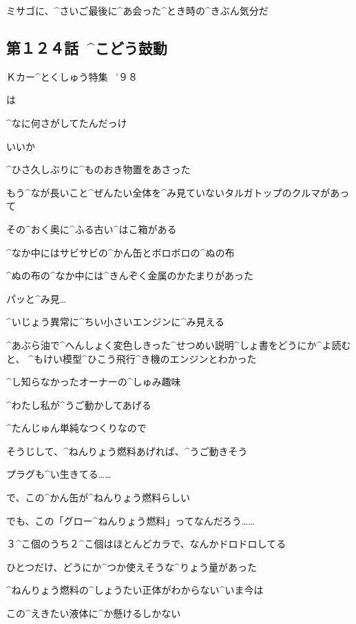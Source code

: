 \Ayase ミサゴに、^{さいご}{最後}に^{あ}{会}った^{とき}{時}の^{きぶん}{気分}だ


\subsection{第１２４話\ ^{こどう}{鼓動}}

\page[52]
\Sign Ｋカー^{とくしゅう}{特集}
\ ’９８

\Alpha は

\Alpha ^{なに}{何}さがしてたんだっけ

\page[53]
\Alpha いいか

\Alpha ^{ひさ}{久}しぶりに^{ものおき}{物置}をあさった

\Alpha もう^{なが}{長}いこと^{ぜんたい}{全体}を^{み}{見}ていないタルガトップのクルマがあって

\Alpha その^{おく}{奥}に^{ふる}{古}い^{はこ}{箱}がある

\page[54]
\Alpha ^{なか}{中}にはサビサビの^{かん}{缶}とボロボロの^{ぬの}{布}

\Alpha ^{ぬの}{布}の^{なか}{中}には^{きんぞく}{金属}のかたまりがあった

\Alpha パッと^{み}{見}…

\Alpha ^{いじょう}{異常}に^{ちい}{小}さいエンジンに^{み}{見}える

\page[55]
\Alpha ^{あぶら}{油}で^{へんしょく}{変色}しきった^{せつめい}{説明}^{しょ}{書}をどうにか^{よ}{読}むと、
^{もけい}{模型}^{ひこう}{飛行}^{き}{機}のエンジンとわかった

\Alpha ^{し}{知}らなかったオーナーの^{しゅみ}{趣味}

\Alpha ^{わたし}{私}が^{うご}{動}かしてあげる

\page[56]
\Alpha ^{たんじゅん}{単純}なつくりなので

\Alpha そうじして、^{ねんりょう}{燃料}あげれば、^{うご}{動}きそう

\Alpha プラグも^{い}{生}きてる……

\Alpha で、この^{かん}{缶}が^{ねんりょう}{燃料}らしい

\Alpha でも、この「グロー^{ねんりょう}{燃料}」ってなんだろう……

\Alpha ３^{こ}{個}のうち２^{こ}{個}はほとんどカラで、なんかドロドロしてる

\Alpha ひとつだけ、どうにか^{つか}{使}えそうな^{りょう}{量}があった

\Alpha ^{ねんりょう}{燃料}の^{しょうたい}{正体}がわからない^{いま}{今}は

\Alpha この^{えきたい}{液体}に^{か}{懸}けるしかない

